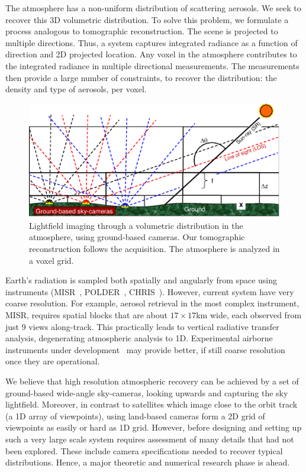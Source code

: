 \documentclass[10pt,twocolumn,letterpaper]{article}
\begin{document}
The atmosphere has a non-uniform distribution of scattering aerosols. We seek to recover this 3D volumetric distribution. To solve this problem, we formulate a process analogous to tomographic reconstruction. The scene is projected to multiple directions. Thus, a system captures integrated radiance as a function of direction and 2D projected location. Any voxel in the atmosphere contributes to the integrated radiance in multiple directional measurements. The measurements then provide a large number of constraints, to recover the distribution: the density and type of aerosols, per voxel.
\begin{figure}[t!]
   \begin{center}
\vspace{-0.4cm}
    \includegraphics[width=0.99\linewidth]{groundtomog6.eps}
    \end{center}\vspace{-1.5cm}
    \caption{\small
    Lightfield imaging through a volumetric distribution in
    the atmosphere, using ground-based cameras. Our tomographic reconstruction
    follows the acquisition. The atmosphere is analyzed in a voxel grid.}
   \label{fig:groundgrid}
\end{figure}

Earth's radiation is sampled both spatially and angularly from space using instruments (MISR~\cite{diner,matronchik}, POLDER~\cite{breon}, CHRIS~\cite{vanMol}). However, current system have very coarse resolution. For example, aerosol retrieval in the most complex instrument, MISR, requires spatial blocks that are about $17\times 17$km wide, each observed from just 9 views along-track. This practically leads to vertical radiative transfer analysis, degenerating atmospheric analysis to 1D. Experimental airborne instruments under development~\cite{baxter,dinerDavis10} may provide better, if still coarse resolution once they are operational.

We believe that high resolution atmospheric recovery can be achieved by a set of ground-based wide-angle sky-cameras, looking upwards and capturing the sky lightfield.
Moreover, in contrast to satellites which image close to the orbit track (a 1D array of viewpoints), using land-based cameras form a 2D grid of viewpoints as easily or hard as 1D grid. However, before designing and setting up such a very large scale system requires assessment of many details that had not been explored. These include camera specifications needed to recover typical distributions. Hence, a major theoretic and numerical research phase is ahead.
\end{document}
